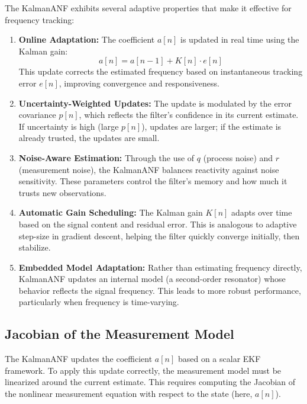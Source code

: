 \documentclass{article}
\begin{document}
The KalmanANF exhibits several adaptive properties that make it effective for frequency tracking:

\begin{enumerate}
  \item \textbf{Online Adaptation:} The coefficient \( a[n] \) is updated in real time using the Kalman gain:
  \[
  a[n] = a[n-1] + K[n] \cdot e[n]
  \]
  This update corrects the estimated frequency based on instantaneous tracking error \( e[n] \), improving convergence and responsiveness.

  \item \textbf{Uncertainty-Weighted Updates:} The update is modulated by the error covariance \( p[n] \), which reflects the filter's confidence in its current estimate. If uncertainty is high (large \( p[n] \)), updates are larger; if the estimate is already trusted, the updates are small.

  \item \textbf{Noise-Aware Estimation:} Through the use of \( q \) (process noise) and \( r \) (measurement noise), the KalmanANF balances reactivity against noise sensitivity. These parameters control the filter’s memory and how much it trusts new observations.

  \item \textbf{Automatic Gain Scheduling:} The Kalman gain \( K[n] \) adapts over time based on the signal content and residual error. This is analogous to adaptive step-size in gradient descent, helping the filter quickly converge initially, then stabilize.

  \item \textbf{Embedded Model Adaptation:} Rather than estimating frequency directly, KalmanANF updates an internal model (a second-order resonator) whose behavior reflects the signal frequency. This leads to more robust performance, particularly when frequency is time-varying.
\end{enumerate}

\subsection{Jacobian of the Measurement Model}

The KalmanANF updates the coefficient \( a[n] \) based on a scalar EKF framework. To apply this update correctly, the measurement model must be linearized around the current estimate. This requires computing the Jacobian of the nonlinear measurement equation with respect to the state (here, \( a[n] \)).
\end{document}
